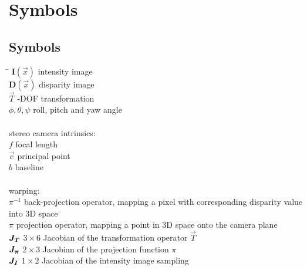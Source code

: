 \chapter*{Symbols}
\label{sec:symbols}

\section*{Symbols}

\begin{tabbing}
 \hspace*{1.6cm} \= \kill
 $\mathbf{I}(\vec{x})$          \> intensity image \\[0.5ex]
 $\mathbf{D}(\vec{x})$          \> disparity image \\[0.5ex]
 $\vec{T}$                      -DOF transformation \\[0.5ex]
 $\phi, \theta, \psi$           \> roll, pitch and yaw angle \\[0.5ex]
 \\
 stereo camera intrinsics: \\
 $f$                            \> focal length \\[0.5ex]
 $\vec{c}$                      \> principal point \\[0.5ex]
 $b$                            \> baseline \\[0.5ex]
 \\
 warping: \\
 $\pi^{-1}$                     \> back-projection operator, mapping a pixel with corresponding disparity value into 3D space \\[0.5ex]
 $\pi$                          \> projection operator, mapping a point in 3D space onto the camera plane \\[0.5ex]
 $\mat{J_T}$                    \> $3 \times 6$ Jacobian of the transformation operator $\vec{T}$ \\[0.5ex]
 $\mat{J_{\pi}}$                    \> $2 \times 3$ Jacobian of the projection function $\pi$ \\[0.5ex]
 $\mat{J_I}$                    \> $1 \times 2$ Jacobian of the intensity image sampling \\[0.5ex]
\end{tabbing}


